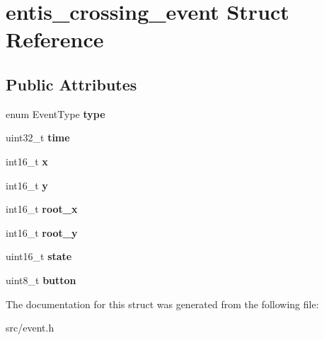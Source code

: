 \hypertarget{structentis__crossing__event}{}\section{entis\+\_\+crossing\+\_\+event Struct Reference}
\label{structentis__crossing__event}
\subsection*{Public Attributes}
\begin{DoxyCompactItemize}
\item 
\mbox{\label{structentis__crossing__event_a0704f9ab8dcc7470a5d815858385d95b}} 
enum Event\+Type {\bfseries type}
\item 
\mbox{\label{structentis__crossing__event_abff68169233c526bd9b97e5c230012f6}} 
uint32\+\_\+t {\bfseries time}
\item 
\mbox{\label{structentis__crossing__event_aa1ce0bafa36f51928e811ae8e67a2fc1}} 
int16\+\_\+t {\bfseries x}
\item 
\mbox{\label{structentis__crossing__event_a9d41070d2ee7fd0a3f7d124472008a3f}} 
int16\+\_\+t {\bfseries y}
\item 
\mbox{\label{structentis__crossing__event_a37822adfb16aad7ffa24dc35dbd6cc63}} 
int16\+\_\+t {\bfseries root\+\_\+x}
\item 
\mbox{\label{structentis__crossing__event_aba07aa05ed91f4c39122772fbb205198}} 
int16\+\_\+t {\bfseries root\+\_\+y}
\item 
\mbox{\label{structentis__crossing__event_a51320a96afcfd1a43c8d5642b96f84a4}} 
uint16\+\_\+t {\bfseries state}
\item 
\mbox{\label{structentis__crossing__event_a4deebfaba719f0b90f83a7320b900cab}} 
uint8\+\_\+t {\bfseries button}
\end{DoxyCompactItemize}


The documentation for this struct was generated from the following file\+:\begin{DoxyCompactItemize}
\item 
src/event.\+h\end{DoxyCompactItemize}
